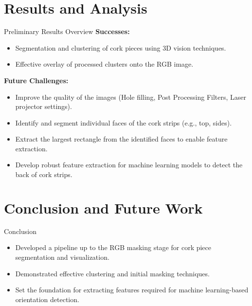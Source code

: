 \documentclass[10pt]{beamer}
\begin{document}
	\section{Results and Analysis}
	\begin{frame}{Preliminary Results Overview}
		\textbf{Successes:}
		\begin{itemize}
			\item Segmentation and clustering of cork pieces using 3D vision techniques.
			\item Effective overlay of processed clusters onto the RGB image.
		\end{itemize}
		\textbf{Future Challenges:}
		\begin{itemize}
			\item Improve the quality of the images (Hole filling, Post Processing Filters, Laser projector settings).
			\item Identify and segment individual faces of the cork strips (e.g., top, sides).
			\item Extract the largest rectangle from the identified faces to enable feature extraction.
			\item Develop robust feature extraction for machine learning models to detect the back of cork strips.
		\end{itemize}
	\end{frame}
	
\section{Conclusion and Future Work}
\begin{frame}{Conclusion}
	\begin{itemize}
		\item Developed a pipeline up to the RGB masking stage for cork piece segmentation and visualization.
		\item Demonstrated effective clustering and initial masking techniques.
		\item Set the foundation for extracting features required for machine learning-based orientation detection.
	\end{itemize}
\end{frame}
\end{document}
